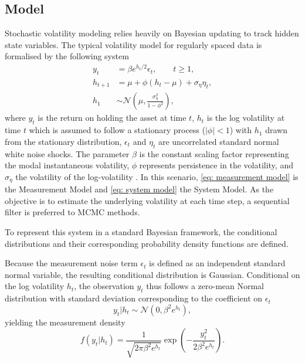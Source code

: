 \documentclass[10pt, a4paper]{article}
\numberwithin{equation}{section}
\begin{document}
\subsection{Model}
Stochastic volatility modeling relies heavily on Bayesian updating to track hidden state variables. The typical volatility model for regularly spaced data is formalised by the following system \parencite{Kim1998}
\begin{align}
    y_t &= \beta e^{h_t / 2} \epsilon_t, \quad \quad t \geq 1, \label{eq: measurement model} \\
    h_{t+1} &= \mu + \phi\left(h_t - \mu\right) + \sigma_\eta \eta_t, \label{eq: system model} \\
    h_1 &\sim \mathcal{N}\left(\mu, \frac{\sigma_\eta^2}{1 - \phi^2}\right),
\end{align}
where \(y_t\) is the return on holding the asset at time \(t\), \(h_t\) is the log volatility at time \(t\) which is assumed to follow a stationary process (\(|\phi| < 1\)) with \(h_1\) drawn from the stationary distribution, \(\epsilon_t\) and \(\eta_t\) are uncorrelated standard normal white noise shocks. The parameter \(\beta\) is the constant scaling factor representing the modal instantaneous volatility, \(\phi\) represents persistence in the volatility, and \(\sigma_\eta\) the volatility of the log-volatility \parencite{Kim1998}. In this scenario, \autoref{eq: measurement model} is the Measurement Model and \autoref{eq: system model} the System Model. As the objective is to estimate the underlying volatility at each time step, a sequential filter is preferred to MCMC methods.

To represent this system in a standard Bayesian framework, the conditional distributions and their corresponding probability density functions are defined. 

Because the measurement noise term $\epsilon_t$ is defined as an independent standard normal variable, the resulting conditional distribution is Gaussian. Conditional on the log volatility \(h_t\), the observation \(y_t\) thus follows a zero-mean Normal distribution with standard deviation corresponding to the coefficient on \(\epsilon_t\)
\begin{equation}
    y_t | h_t \sim \mathcal{N}\left(0, \beta^2 e^{h_t}\right),
\end{equation}
yielding the measurement density
\begin{equation}
    f(y_t | h_t) = \frac{1}{\sqrt{2\pi\beta^2 e^{h_t}}} \exp\left(-\frac{y_t^2}{2\beta^2 e^{h_t}}\right).
\end{equation}
\end{document}
